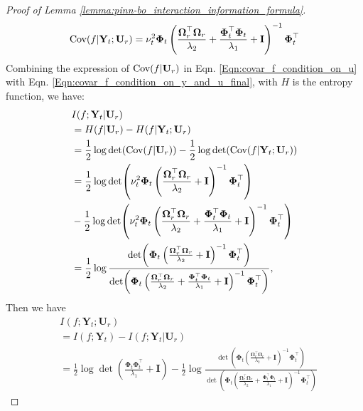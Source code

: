 \begin{proof}[Proof of Lemma \ref{lemma:pinn-bo_interaction_information_formula}]
\begin{equation}
\label{Eqn:covar_f_condition_on_y_and_u_final}
    \textup{Cov}(f \rvert \mathbf{Y}_t; \mathbf{U}_r) = \nu_t^2\boldsymbol{\Phi}_t \left(\frac{\boldsymbol{\Omega}_r^\top\boldsymbol{\Omega}_r}{\lambda_2}+\frac{\boldsymbol{\Phi}_t^\top \boldsymbol{\Phi}_t} {\lambda_1} + \mathbf{I}\right)^{-1} \boldsymbol{\Phi}_t^\top
\end{equation}
Combining the expression of $\textup{Cov}(f\rvert \mathbf{U}_r)$ in Eqn. \eqref{Eqn:covar_f_condition_on_u} with Eqn. \eqref{Eqn:covar_f_condition_on_y_and_u_final}, with $H$ is the entropy function, we have:
\begin{align}
     & I(f;\mathbf{Y}_t \rvert \mathbf{U}_r)  \nonumber
\\
     &= H(f \rvert \mathbf{U}_r) - H(f \rvert \mathbf{Y}_t; \mathbf{U}_r)  \nonumber
\\
     & = \frac{1}{2}\log\det (\textup{Cov}(f \rvert \mathbf{U}_r)) - \frac{1}{2}\log\det (\textup{Cov}(f \rvert \mathbf{Y}_t;  \mathbf{U}_r)) \nonumber
\\
     & = \frac{1}{2}\log \det (\nu_t^2\boldsymbol{\Phi}_t \left(\frac{\boldsymbol{\Omega}_r^\top \boldsymbol{\Omega}_r}{\lambda_2} + \mathbf{I}\right)^{-1} \boldsymbol{\Phi}_t^\top) \nonumber 
\\
     & - \frac{1}{2}\log\det (\nu_t^2\boldsymbol{\Phi}_t \left(\frac{\boldsymbol{\Omega}_r^\top\boldsymbol{\Omega}_r}{\lambda_2}+\frac{\boldsymbol{\Phi}_t^\top \boldsymbol{\Phi}_t} {\lambda_1} + \mathbf{I}\right)^{-1} \boldsymbol{\Phi}_t^\top) \nonumber
\\
     &= \frac{1}{2} \log \frac{\det(\boldsymbol{\Phi}_t \left(\frac{\boldsymbol{\Omega}_r^\top \boldsymbol{\Omega}_r}{\lambda_2} + \mathbf{I}\right)^{-1} \boldsymbol{\Phi}_t^\top)}{\det(\boldsymbol{\Phi}_t \left(\frac{\boldsymbol{\Omega}_r^\top\boldsymbol{\Omega}_r}{\lambda_2}+\frac{\boldsymbol{\Phi}_t^\top \boldsymbol{\Phi}_t} {\lambda_1} + \mathbf{I}\right)^{-1} \boldsymbol{\Phi}_t^\top)}, \label{Eqn:conditional_information_f_and_Yt_give_Ur}
\end{align}
Then we have 
\begin{align}
    & I (f; \mathbf{Y}_t; \mathbf{U}_r) \nonumber 
\\
    & =  I(f; \mathbf{Y}_t) - I (f; \mathbf{Y}_t \rvert \mathbf{U}_r) \nonumber
\\
        &= \frac{1}{2} \log \det (\frac{\boldsymbol{\Phi}_t\boldsymbol{\Phi}_t^\top}{\lambda_1} +\mathbf{I}) - \frac{1}{2} \log \frac{\det(\boldsymbol{\Phi}_t \left(\frac{\boldsymbol{\Omega}_r^\top \boldsymbol{\Omega}_r}{\lambda_2} + \mathbf{I}\right)^{-1} \boldsymbol{\Phi}_t^\top)}{\det(\boldsymbol{\Phi}_t \left(\frac{\boldsymbol{\Omega}_r^\top\boldsymbol{\Omega}_r}{\lambda_2}+\frac{\boldsymbol{\Phi}_t^\top \boldsymbol{\Phi}_t} {\lambda_1} + \mathbf{I}\right)^{-1} \boldsymbol{\Phi}_t^\top)} \nonumber

\end{align}
\end{proof}
